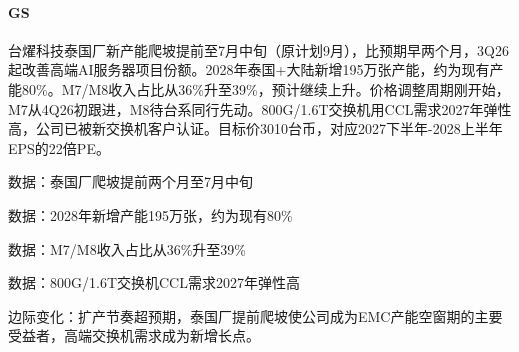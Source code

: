 \documentclass[11pt]{ctexart}
\begin{document}
\paragraph{GS} 台燿科技泰国厂新产能爬坡提前至7月中旬（原计划9月），比预期早两个月，3Q26起改善高端AI服务器项目份额。2028年泰国+大陆新增195万张产能，约为现有产能80\%。M7/M8收入占比从36\%升至39\%，预计继续上升。价格调整周期刚开始，M7从4Q26初跟进，M8待台系同行先动。800G/1.6T交换机用CCL需求2027年弹性高，公司已被新交换机客户认证。目标价3010台币，对应2027下半年-2028上半年EPS的22倍PE。
{\small\color{refgray}数据：泰国厂爬坡提前两个月至7月中旬\par}
{\small\color{refgray}数据：2028年新增产能195万张，约为现有80\%\par}
{\small\color{refgray}数据：M7/M8收入占比从36\%升至39\%\par}
{\small\color{refgray}数据：800G/1.6T交换机CCL需求2027年弹性高\par}
{\small\color{refgray}边际变化：扩产节奏超预期，泰国厂提前爬坡使公司成为EMC产能空窗期的主要受益者，高端交换机需求成为新增长点。\par}
\end{document}
